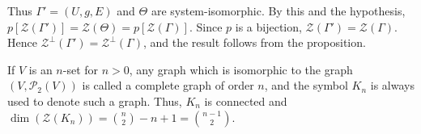 Thus $\Gamma' = (U, g, E)$ and $\Theta$ are system-isomorphic. By this and the hypothesis, $p[\mathcal{Z}(\Gamma')] = \mathcal{Z}(\Theta) = p[\mathcal{Z}(\Gamma)]$. Since $p$ is a bijection, $\mathcal{Z}(\Gamma') = \mathcal{Z}(\Gamma)$. Hence $\mathcal{Z}^\perp(\Gamma') = \mathcal{Z}^\perp(\Gamma)$, and the result follows from the proposition.

If $V$ is an $n$-set for $n > 0$, any graph which is isomorphic to the graph $(V, \mathcal{P}_2(V))$ is called a complete graph of order $n$, and the symbol $K_n$ is always used to denote such a graph. Thus, $K_n$ is connected and $\dim(\mathcal{Z}(K_n)) = \binom{n}{2} - n + 1 = \binom{n-1}{2}$.
